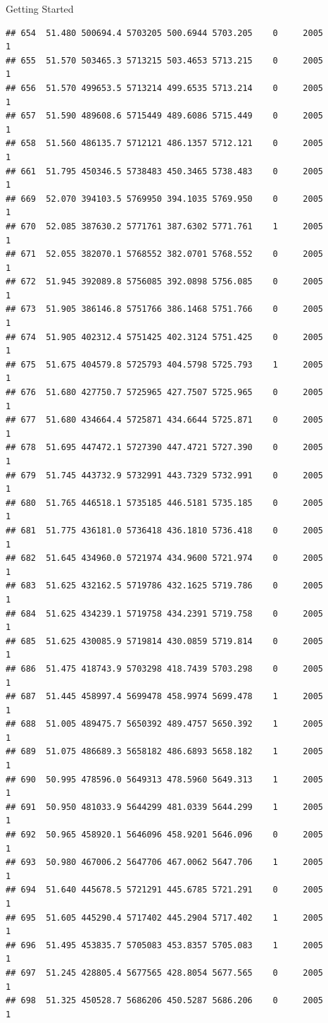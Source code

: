 \documentclass[
  ignorenonframetext,
]{beamer}
\begin{document}
\begin{frame}[fragile]{Getting Started}
\begin{verbatim}
## 654  51.480 500694.4 5703205 500.6944 5703.205    0     2005        1
## 655  51.570 503465.3 5713215 503.4653 5713.215    0     2005        1
## 656  51.570 499653.5 5713214 499.6535 5713.214    0     2005        1
## 657  51.590 489608.6 5715449 489.6086 5715.449    0     2005        1
## 658  51.560 486135.7 5712121 486.1357 5712.121    0     2005        1
## 661  51.795 450346.5 5738483 450.3465 5738.483    0     2005        1
## 669  52.070 394103.5 5769950 394.1035 5769.950    0     2005        1
## 670  52.085 387630.2 5771761 387.6302 5771.761    1     2005        1
## 671  52.055 382070.1 5768552 382.0701 5768.552    0     2005        1
## 672  51.945 392089.8 5756085 392.0898 5756.085    0     2005        1
## 673  51.905 386146.8 5751766 386.1468 5751.766    0     2005        1
## 674  51.905 402312.4 5751425 402.3124 5751.425    0     2005        1
## 675  51.675 404579.8 5725793 404.5798 5725.793    1     2005        1
## 676  51.680 427750.7 5725965 427.7507 5725.965    0     2005        1
## 677  51.680 434664.4 5725871 434.6644 5725.871    0     2005        1
## 678  51.695 447472.1 5727390 447.4721 5727.390    0     2005        1
## 679  51.745 443732.9 5732991 443.7329 5732.991    0     2005        1
## 680  51.765 446518.1 5735185 446.5181 5735.185    0     2005        1
## 681  51.775 436181.0 5736418 436.1810 5736.418    0     2005        1
## 682  51.645 434960.0 5721974 434.9600 5721.974    0     2005        1
## 683  51.625 432162.5 5719786 432.1625 5719.786    0     2005        1
## 684  51.625 434239.1 5719758 434.2391 5719.758    0     2005        1
## 685  51.625 430085.9 5719814 430.0859 5719.814    0     2005        1
## 686  51.475 418743.9 5703298 418.7439 5703.298    0     2005        1
## 687  51.445 458997.4 5699478 458.9974 5699.478    1     2005        1
## 688  51.005 489475.7 5650392 489.4757 5650.392    1     2005        1
## 689  51.075 486689.3 5658182 486.6893 5658.182    1     2005        1
## 690  50.995 478596.0 5649313 478.5960 5649.313    1     2005        1
## 691  50.950 481033.9 5644299 481.0339 5644.299    1     2005        1
## 692  50.965 458920.1 5646096 458.9201 5646.096    0     2005        1
## 693  50.980 467006.2 5647706 467.0062 5647.706    1     2005        1
## 694  51.640 445678.5 5721291 445.6785 5721.291    0     2005        1
## 695  51.605 445290.4 5717402 445.2904 5717.402    1     2005        1
## 696  51.495 453835.7 5705083 453.8357 5705.083    1     2005        1
## 697  51.245 428805.4 5677565 428.8054 5677.565    0     2005        1
## 698  51.325 450528.7 5686206 450.5287 5686.206    0     2005        1

\end{verbatim}
\end{frame}
\end{document}
